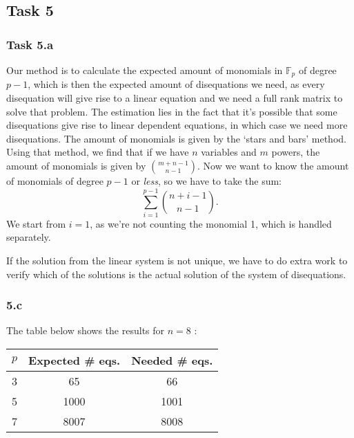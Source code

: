 \documentclass{article}
\begin{document}
\clearpage

\subsection*{Task 5}

\subsubsection*{Task 5.a}
Our method is to calculate the expected amount of monomials in $\mathbb{F}_p$ of
degree $p - 1$, which is then the expected amount of disequations we need, as
every disequation will give rise to a linear equation and we need a full rank
matrix to solve that problem. The estimation lies in the fact that it's possible
that some disequations give rise to linear dependent equations, in which case we
need more disequations. The amount of monomials is given by the `stars and bars'
method. Using that method, we find that if we have $n$ variables and $m$ powers,
the amount of monomials is given by ${m + n - 1}\choose{n - 1}$. Now we want to know
the amount of monomials of degree $p-1$ or \textit{less}, so we have to take the
sum:
\begin{equation}
  \sum_{i = 1}^{p-1}  {{n + i - 1}\choose{n - 1}}.
\end{equation} 
We start from $i = 1$, as we're not counting the monomial 1, which is handled
separately.

If the solution from the linear system is not unique, we have to do extra work
to verify which of the solutions is the actual solution of the system of
disequations.

\subsubsection*{5.c}

The table below shows the results for $n = 8$ :

 \begin{table}[htpb]
  \centering
  \label{tab:label}
  \begin{tabular}{ccc}
    \toprule
    $p$ & Expected \# eqs. & Needed \# eqs. \\
    \midrule
    3 & 65 & 66 \\
    \midrule
    5 &1000&  1001 \\
    \midrule
    7 &8007& 8008\\
    \bottomrule
  \end{tabular}
\end{table}
\end{document}
